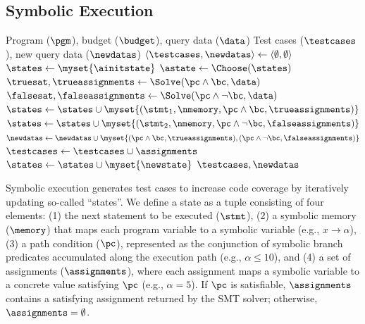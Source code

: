 \subsection{Symbolic Execution}\label{sec:se}

\begin{algorithm}[t] \footnotesize
  \caption{Symbolic Execution}
  \label{alg:symbexec}
  \begin{algorithmic}[1]
    \Require Program ($\pgm$), budget ($\budget$), query data ($\data$)
    \Ensure Test cases ($\testcases$), new query data ($\newdatas$)
    \Procedure{{\symb}}{$\pgm, \budget, \data$}
    \State $\langle \testcases, \newdatas \rangle \gets \langle \emptyset, \emptyset \rangle$ 
    \State $\states \gets \myset{\ainitstate}$  
    \Repeat
        \State $\astate \gets \Choose(\states)$ \Comment{$\astate=(\stmt, \memory, \pc, \assignments)$}
            \State $\truesat, \trueassignments \gets \Solve(\pc \land \bc, \data)$
            \State $\falsesat, \falseassignments \gets \Solve(\pc \land \neg \bc, \data)$
        	\If{$\truesat$}
		       $\states \gets \states \cup \myset{(\stmt_{1}, \nmemory, \pc \land \bc, \trueassignments)}$
		    \EndIf
        	\If{$\falsesat$}
		       $\states \gets \states \cup \myset{(\stmt_{2}, \nmemory, \pc \land \neg \bc, \falseassignments)}$
		    \EndIf
            \State $\newdatas \gets \newdatas \cup \myset{(\pc \land \bc, \trueassignments), (\pc \land \neg \bc, \falseassignments)}$
            \State $\testcases \gets \testcases \cup \assignments$   \Comment{$\astate = (\stmt, \_, \_, \assignments)$} 
        \Else
            \State $\states \gets \states \cup \myset{\newstate}$   
        \EndIf
    \State \Return $\testcases, \newdatas$
    \EndProcedure
\end{algorithmic}
\end{algorithm}

Symbolic execution generates test cases to increase code coverage by iteratively updating so-called ``states''. We define a state as a tuple consisting of four elements: (1) the next statement to be executed ($\stmt$), (2) a symbolic memory ($\memory$) that maps each program variable to a symbolic variable (e.g., $x\to\alpha$), (3) a path condition ($\pc$), represented as the conjunction of symbolic branch predicates accumulated along the execution path (e.g., $\alpha \le 10$), and (4) a set of assignments ($\assignments$), where each assignment maps a symbolic variable to a concrete value satisfying $\pc$ (e.g., $\alpha = 5$). If $\pc$ is satisfiable, $\assignments$ contains a satisfying assignment returned by the SMT solver; otherwise, $\assignments = \emptyset$.

